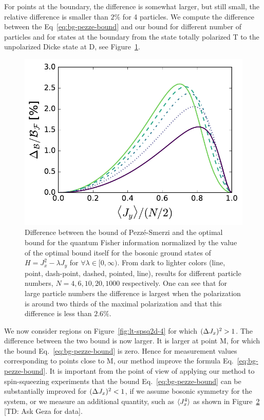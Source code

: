 For points at the boundary, the difference is somewhat larger, but still small, the relative difference is smaller than $2\%$ for 4 particles.
We compute the difference between the Eq~\eqref{eq:bg-pezze-bound} and our bound for different number of particles and for states at the boundary from the state totally polarized T to the unpolarized Dicke state at D, see Figure~\ref{fig:lt-edge-diff}.
\begin{figure}[htp]
  \centering
  \includegraphics[scale=.65]{img/LT_edge_diff.pdf}
  \caption[Comparison of our bound with the Pezz\'e-Smerzi bound.]{
  Difference between the bound of Pezz\'e-Smerzi and the optimal bound for the quantum Fisher information normalized by the value of the optimal bound itself for the bosonic ground states of $H=J_x^2-\lambda J_y$ for $\forall \lambda \in [0,\infty)$.
  From dark to lighter colors (line, point, dash-point, dashed, pointed, line), results for different particle numbers, $N=4,6,10,20,1000$ respectively.
  One can see that for large particle numbers the difference is largest when the polarization is around two thirds of the maximal polarization and that this difference is less than $2.6\%$.}
  \label{fig:lt-edge-diff}
\end{figure}

We now consider regions on Figure~\ref{fig:lt-spsq2d-4} for which $(\Delta J_x )^2>1$.
The difference between the two bound is now larger.
It is larger at point M, for which the bound Eq.~\eqref{eq:bg-pezze-bound} is zero.
Hence for measurement values corresponding to points close to M, our method improve the formula Eq.~\eqref{eq:bg-pezze-bound}.
It is important from the point of view of applying our method to spin-squeezing experiments that the bound Eq.~\eqref{eq:bg-pezze-bound} can be substantially improved for $(\Delta J_x )^2<1$, if we assume bosonic symmetry for the system, or we measure an additional quantity, such as $\langle{J_x^4}\rangle$ as shown in Figure~\ref{fig:lt-adding-jx4-to-the-bound} [TD: Ask Geza for data].
\begin{figure}[htp]
  \centering
  \label{fig:lt-adding-jx4-to-the-bound}
\end{figure}


